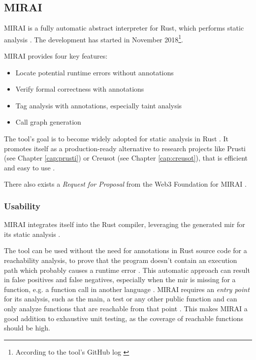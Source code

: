 \subsection{MIRAI}
MIRAI is a fully automatic abstract interpreter for Rust, which performs static analysis \cite{facebookexperimental_miraidocumentationoverviewmd_2021,facebookexperimental_facebookexperimentalmirai_2023}. The development has started in November 2018\footnote{According to the tool's GitHub log \cite{facebookexperimental_first_2018}}.

MIRAI provides four key features:
\begin{itemize}
    \item Locate potential runtime errors without annotations \cite{facebookexperimental_facebookexperimentalmirai_2023}
    \item Verify formal correctness with annotations \cite{facebookexperimental_facebookexperimentalmirai_2023}
    \item Tag analysis with annotations, especially taint analysis \cite{facebookexperimental_miraidocumentationoverviewmd_2021,facebookexperimental_facebookexperimentalmirai_2023}
    \item Call graph generation \cite{facebookexperimental_miraidocumentationcallgraphmd_2022}
\end{itemize}

The tool's goal is to become widely adopted for static analysis in Rust \cite{facebookexperimental_facebookexperimentalmirai_2023}. It promotes itself as a production-ready alternative to research projects like Prusti (see Chapter \ref{cap:prusti}) or Creusot (see Chapter \ref{cap:creusot}), that is efficient and easy to use \cite{facebookexperimental_miraidocumentationoverviewmd_2021}.

There also exists a \textit{Request for Proposal} from the Web3 Foundation for MIRAI \cite{web3_foundation_grants-programdocsrfpsopenstatic-analysis-for-runtime-palletsmd_2023}.

\subsubsection{Usability}

MIRAI integrates itself into the Rust compiler, leveraging the generated \acs{mir} for its static analysis \cite{facebookexperimental_miraidocumentationwhypluginmd_2021}.

The tool can be used without the need for annotations in Rust source code for a reachability analysis, to prove that the program doesn't contain an execution path which probably causes a runtime error \cite{facebookexperimental_miraidocumentationoverviewmd_2021}. This automatic approach can result in false positives and false negatives, especially when the \acs{mir} is missing for a function, e.g. a function call in another language \cite{facebookexperimental_miraidocumentationoverviewmd_2021}. MIRAI requires an \textit{entry point} for its analysis, such as the main, a test or any other public function and can only analyze functions that are reachable from that point \cite{facebookexperimental_miraidocumentationoverviewmd_2021}. This makes MIRAI a good addition to exhaustive unit testing, as the coverage of reachable functions should be high.

